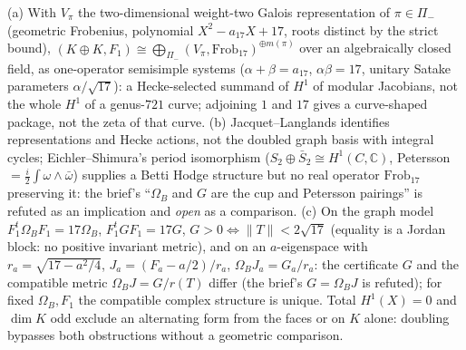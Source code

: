 \begin{theorem}
\label{thm:lps-bass-frobenius}
(a) With $V_\pi$ the two-dimensional weight-two Galois representation of $\pi\in\Pi_-$ (geometric Frobenius, polynomial
$X^2-a_{17}X+17$, roots distinct by the strict bound), $(K\oplus K,F_1)\cong\bigoplus_{\Pi_-}(V_\pi,\mathrm{Frob}_{17})^{\oplus m(\pi)}$
over an algebraically closed field, as one-operator semisimple systems ($\alpha+\beta = a_{17}$, $\alpha\beta = 17$, unitary Satake
parameters $\alpha/\sqrt{17}$): a Hecke-selected summand of $H^1$ of modular Jacobians, not the whole $H^1$ of a genus-$721$
curve; adjoining $1$ and $17$ gives a curve-shaped package, not the zeta of that curve. (b) Jacquet--Langlands identifies
representations and Hecke actions, not the doubled graph basis with integral cycles; Eichler--Shimura's period isomorphism
($S_2\oplus\bar S_2\cong H^1(C,\mathbb C)$, Petersson $= \tfrac i2\int\omega\wedge\bar\omega$) supplies a Betti Hodge structure but no
real operator $\mathrm{Frob}_{17}$ preserving it: the brief's ``$\Omega_B$ and $G$ are the cup and Petersson pairings'' is %
refuted as an implication and \emph{open} as a comparison. (c) On the graph model $F_1^{t}\Omega_BF_1 = 17\Omega_B$, %
$F_1^{t}GF_1 = 17G$, $G>0\iff\|T\|<2\sqrt{17}$ (equality is a Jordan block: no positive invariant metric), and on an
$a$-eigenspace with $r_a = \sqrt{17-a^2/4}$, $J_a = (F_a-a/2)/r_a$, $\Omega_BJ_a = G_a/r_a$: the certificate $G$ and the %
compatible metric $\Omega_BJ = G/r(T)$ differ (the brief's $G = \Omega_BJ$ is refuted); for fixed $\Omega_B,F_1$ the compatible %
complex structure is unique. Total $H^1(X) = 0$ and $\dim K$ odd exclude an alternating form from the faces or on $K$ alone:
doubling bypasses both obstructions without a geometric comparison.
\end{theorem}

